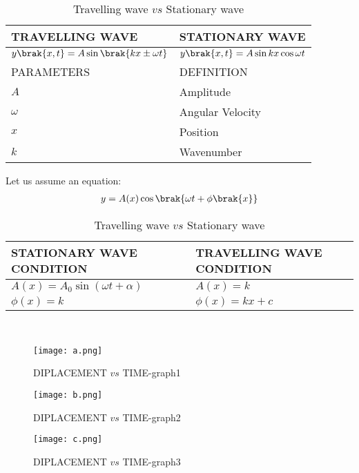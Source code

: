 \documentclass[journal,12pt,twocolumn]{IEEEtran}
\theoremstyle{remark}
\begin{document}
\begin{table}[htbp]
    \centering
    \def\arraystretch{1.5}
    \begin{tabular}{|p{4cm}|p{4cm}|}
    \hline
TRAVELLING WAVE  & STATIONARY WAVE \\ \hline
    $y \brak{x,t} =A \sin  \brak{kx \pm \omega t} $ & $y\brak{ x,t }=A\sin kx\cos \omega t $ \\   \hline
    \hline
PARAMETERS  & DEFINITION  \\  \hline
$A$    &  Amplitude  \\ \hline
 $\omega$  & Angular Velocity  \\  \hline
 $x$    & Position  \\  \hline
 $k$    & Wavenumber    \\  \hline 
    \end{tabular}
    \caption{Travelling wave $vs$ Stationary wave}
    \label{tab:table1}
\end{table}
Let us assume an equation:
\begin{align}
y=A(x)\cos \brak{\omega t+\phi\brak {x}}
\end{align}
\begin{table}[htbp]
    \centering
    \def\arraystretch{1.5}
    \begin{tabular}{|p{4cm}|p{4cm}|}
    \hline
STATIONARY WAVE CONDITION & TRAVELLING WAVE CONDITION \\ \hline
        $A(x)= A_{0}\sin(\omega t+\alpha)$   & 
        $A(x)=k$  \\ \hline
         $\phi (x)=k$  &
         $\phi (x)=kx+c$ \\ \hline
\end{tabular}
    \caption{Travelling wave $vs$ Stationary wave}
    \label{tab:table2}
\end{table} \\
\begin{figure}[ht]
                        \centering
                        \texttt{[image: a.png]}
                        \caption{DIPLACEMENT $vs$ TIME-graph1}
                        \label{fig:1}
\end{figure}
\begin{figure}[ht]
                            \centering
                            \texttt{[image: b.png]}
                            \caption{DIPLACEMENT $vs$ TIME-graph2}
                            \label{fig:2}
\end{figure}   
\begin{figure}[ht]
                             \centering
                             \texttt{[image: c.png]}
                             \caption{DIPLACEMENT $vs$ TIME-graph3}
                             \label{fig:3}
\end{figure}
\end{document}
